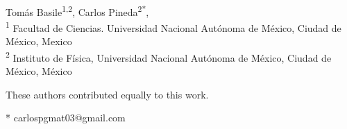 \documentclass[10pt,letterpaper]{article} %
\begin{document}
\vspace*{0.2in}

\begin{flushleft}
{\Large
\textbf{} %
}
\newline
\\
Tomás Basile\textsuperscript{1,2\Yinyang},
Carlos Pineda\textsuperscript{2*\Yinyang},
\\
\bigskip
\textsuperscript{1} Facultad de Ciencias. Universidad Nacional Autónoma de México, Ciudad de México, Mexico
\\
\textsuperscript{2} Instituto de Física, Universidad Nacional Autónoma de México, Ciudad de México, México
\\
\bigskip

% 
%
\Yinyang These authors contributed equally to this work.





* carlospgmat03@gmail.com

\end{flushleft}
\end{document}
